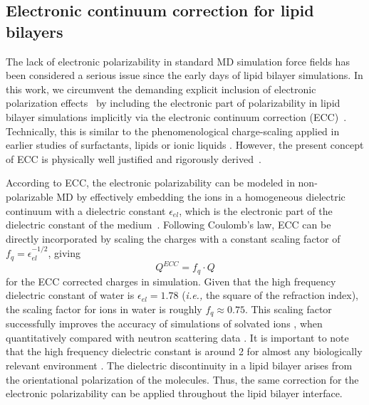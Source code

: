 \documentclass[aip,jcp,twocolumn]{revtex4}
\begin{document}
\subsection{Electronic continuum correction for lipid bilayers}\label{section:ecc}
The lack of electronic polarizability in standard MD simulation force fields has been considered a serious issue since the early days of lipid bilayer simulations. In this work, we circumvent the demanding explicit inclusion of electronic polarization effects~\cite{lucas12, chowdhary13} by including the electronic part of polarizability in lipid bilayer simulations implicitly via the electronic continuum correction (ECC)~\cite{leontyev11}. Technically, this is similar to the phenomenological charge-scaling applied in earlier studies of surfactants, lipids or ionic liquids \cite{jonsson86, egberts94, beichel14}. However, the present concept of ECC is physically well justified and rigorously derived~\cite{leontyev09, leontyev10, leontyev11, leontyev14}.

According to ECC, the electronic polarizability can be modeled in non-polarizable MD by effectively embedding the ions in a homogeneous dielectric continuum with a dielectric constant $\epsilon_{el}$, which is the electronic part of the dielectric constant of the medium~\cite{leontyev11}. Following Coulomb's law,  ECC can be directly incorporated by scaling the charges with a constant scaling factor of $f_q = \epsilon _{el} ^{-1/2}$, giving
\begin{equation}
Q^{ECC} = f_q \cdot Q
\end{equation}
for the ECC corrected charges in simulation. 
Given that the  high frequency dielectric constant of water is $\epsilon _{el} = 1.78$ (\textit{i.e.,} the square of the refraction index), the scaling factor for ions in water is roughly $f_q \approx 0.75$. This scaling factor successfully improves the accuracy of simulations of solvated ions \cite{kohagen14, kohagen16, REF}, when quantitatively compared with neutron scattering data \cite{kohagen14,kohagen16, Pluharova2014}.
It is important to note that the 
high frequency dielectric constant 
is around 2 for almost any biologically relevant environment \cite{some_original_work, leontyev11}.
The dielectric discontinuity in a lipid bilayer arises
from the orientational polarization of the molecules. 
Thus, the same correction for the electronic polarizability can be 
applied throughout the lipid bilayer interface.
\end{document}
